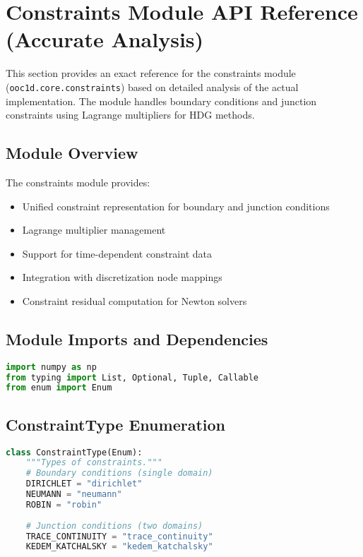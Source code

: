%

\section{Constraints Module API Reference (Accurate Analysis)}
\label{sec:constraints_module_api}

This section provides an exact reference for the constraints module (\texttt{ooc1d.core.constraints}) based on detailed analysis of the actual implementation. The module handles boundary conditions and junction constraints using Lagrange multipliers for HDG methods.

\subsection{Module Overview}

The constraints module provides:
\begin{itemize}
    \item Unified constraint representation for boundary and junction conditions
    \item Lagrange multiplier management
    \item Support for time-dependent constraint data
    \item Integration with discretization node mappings
    \item Constraint residual computation for Newton solvers
\end{itemize}

\subsection{Module Imports and Dependencies}

\begin{lstlisting}[language=Python, caption=Module Dependencies]
import numpy as np
from typing import List, Optional, Tuple, Callable
from enum import Enum
\end{lstlisting}

\subsection{ConstraintType Enumeration}
\label{subsec:constraint_type_enum}

\begin{lstlisting}[language=Python, caption=ConstraintType Enumeration]
class ConstraintType(Enum):
    """Types of constraints."""
    # Boundary conditions (single domain)
    DIRICHLET = "dirichlet"
    NEUMANN = "neumann"
    ROBIN = "robin"
    
    # Junction conditions (two domains)
    TRACE_CONTINUITY = "trace_continuity"
    KEDEM_KATCHALSKY = "kedem_katchalsky"
\end{lstlisting}

